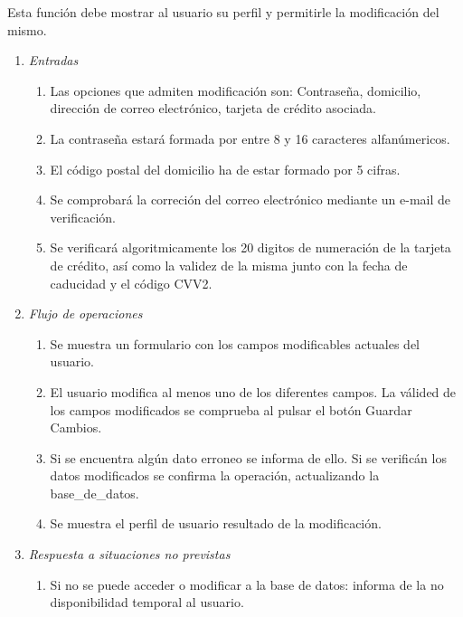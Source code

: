  \label{fun:editarcliente}
	Esta función debe mostrar al usuario su perfil y permitirle la modificación del mismo.

\begin{enumerate}
	\item \textit{Entradas}
	\begin{enumerate}
		\item Las opciones que admiten modificación son: Contraseña, domicilio, dirección de correo electrónico, tarjeta de crédito asociada.
		\item La contraseña estará formada por entre 8 y 16 caracteres alfanúmericos.
		\item El código postal del domicilio ha de estar formado por 5 cifras.
		\item Se comprobará la correción del correo electrónico mediante un e-mail de verificación.
		\item Se verificará algoritmicamente los 20 digitos de numeración de la tarjeta de crédito, así como la validez de la misma junto con la fecha de caducidad y el código \gls{CVV2}.
	\end{enumerate}
	\item \textit{Flujo de operaciones}
	\begin{enumerate}
		\item Se muestra un formulario con los campos modificables actuales del usuario.
		\item El usuario modifica al menos uno de los diferentes campos. La válided de los campos modificados se comprueba al pulsar el botón Guardar Cambios.
		\item Si se encuentra algún dato erroneo se informa de ello. Si se verificán los datos modificados se confirma la operación, actualizando la \gls{base_de_datos}.
		\item Se muestra el perfil de usuario resultado de la modificación.
	\end{enumerate}
	\item \textit{Respuesta a situaciones no previstas}
	\begin{enumerate}
		\item Si no se puede acceder o modificar a la base de datos: informa de la no disponibilidad temporal al usuario.
	\end{enumerate}
\end{enumerate}
